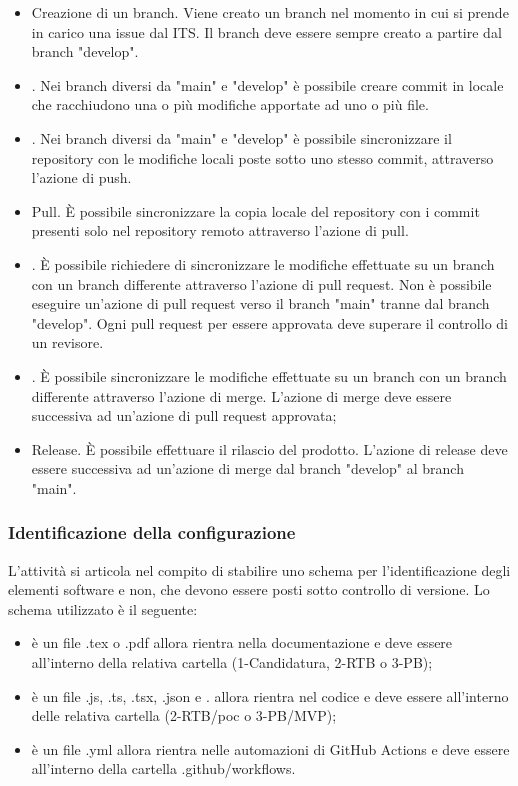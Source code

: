 \begin{itemize}
    \item Creazione di un branch. Viene creato un branch nel momento in cui si prende in carico una issue dal ITS. Il branch deve essere sempre creato a partire dal branch "develop".
    \item {}. Nei branch diversi da "main" e "develop" è possibile creare commit in locale che racchiudono una o più modifiche apportate ad uno o più file.
    \item {}. Nei branch diversi da "main" e "develop" è possibile sincronizzare il repository con le modifiche locali poste sotto uno stesso commit, attraverso l'azione di push.
    \item Pull. È possibile sincronizzare la copia locale del repository con i commit presenti solo nel repository remoto attraverso l'azione di pull.
    \item {}. È possibile richiedere di sincronizzare le modifiche effettuate su un branch con un branch differente attraverso l'azione di pull request. Non è possibile eseguire un'azione di pull request verso il branch "main" tranne dal branch "develop". Ogni pull request per essere approvata deve superare il controllo di un revisore. 
    \item {}. È possibile sincronizzare le modifiche effettuate su un branch con un branch differente attraverso l'azione di merge. L'azione di merge deve essere successiva ad un'azione di pull request approvata;
    \item Release. È possibile effettuare il rilascio del prodotto. L'azione di release deve essere successiva ad un'azione di merge dal branch "develop" al branch "main". 
\end{itemize}

\subsubsection{Identificazione della configurazione}
L'attività si articola nel compito di stabilire uno schema per l'identificazione degli elementi software e non, che devono essere posti sotto controllo di versione. Lo schema utilizzato è il seguente:
\begin{itemize}
    \item è un file .tex o .pdf allora rientra nella documentazione e deve essere all'interno della relativa cartella (1-Candidatura, 2-RTB o 3-PB);
    \item è un file .js, .ts, .tsx, .json e . allora rientra nel codice e deve essere all'interno delle relativa cartella (2-RTB/poc o 3-PB/MVP);
    \item è un file .yml allora rientra nelle automazioni di GitHub Actions e deve essere all'interno della cartella .github/workflows.
\end{itemize}

